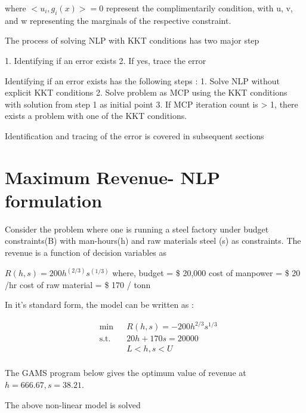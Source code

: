 \documentclass{article}
\begin{document}
where $<u_{i},g_{i}(x)> = 0$  represent the complimentarily condition, with u, v, and w representing the marginals of the respective constraint.

The process of solving NLP with KKT conditions has two major step

1. Identifying if an error exists
2. If yes, trace the error

Identifying if an error exists has the following steps :
1. Solve NLP without explicit KKT conditions
2. Solve problem as MCP using the KKT conditions with solution from step 1 as initial point
3. If MCP iteration count is > 1, there exists a problem with one of the KKT conditions.

Identification and tracing of the error is covered in subsequent sections



\section{Maximum Revenue- NLP formulation}

Consider the problem where one is running a steel factory under budget constraints(B) with man-hours(h) and raw materials steel (s) as constraints. The revenue is a function of decision variables as

$R(h,s) = 200 h^(2/3)s^(1/3) $
where, budget = \$ 20,000
cost of manpower = \$ 20 /hr
cost of raw material = \$ 170 / tonn

In it's standard form, the model can be written as :

\begin{equation}
\begin{aligned}
&	\min
& & R(h,s) = - 200 h^{2/3}s^{1/3}  \\
& \text{s.t.} & & 	 20h + 170s = 20000 \\
& & &			L< h,s < U   \\
\end{aligned}
\end{equation}

The GAMS program below gives the optimum value of revenue at $h = 666.67 , s = 38.21$.



The above non-linear model is solved 
\end{document}
